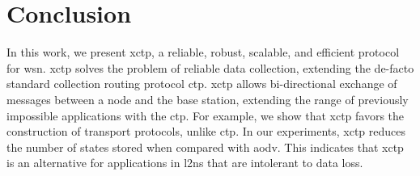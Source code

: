 \section{Conclusion}
\label{sec:conclusion}



In this work, we present \ac{xctp}, a reliable, robust, scalable,
and efficient protocol for \ac{wsn}. \ac{xctp} solves the problem of
reliable data collection, extending the de-facto standard collection
routing protocol \ac{ctp}. \ac{xctp} allows bi-directional exchange
of messages between a node and the base station, extending the range
of previously impossible applications with the \ac{ctp}. For
example, we show that \ac{xctp} favors the construction of transport
protocols, unlike \ac{ctp}. In our experiments, \ac{xctp} reduces
the number of states stored when compared with \ac{aodv}. This
indicates that \ac{xctp} is an alternative for applications in
\ac{l2ns} that are intolerant to data loss.
